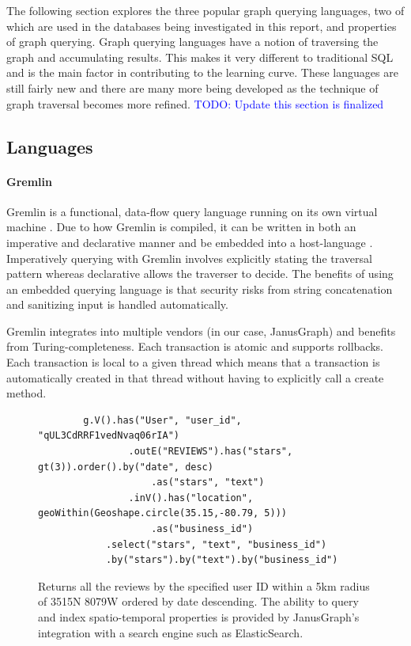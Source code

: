 The following section explores the three popular graph querying languages, two of which are used in the databases being investigated in this report, and properties of graph querying. Graph querying languages have a notion of traversing the graph and accumulating results. This makes it very different to traditional SQL and is the main factor in contributing to the learning curve. These languages are still fairly new and there are many more being developed as the technique of graph traversal becomes more refined. \textcolor{blue}{TODO: Update this section is finalized}

\subsection{Languages}
\label{subsec:lang}

\paragraph{Gremlin}

Gremlin is a functional, data-flow query language running on its own virtual machine \cite{gremlin-tinkerpop}. Due to how Gremlin is compiled, it can be written in both an imperative and declarative manner and be embedded into a host-language \cite{tinkerpop-docs}. Imperatively querying with Gremlin involves explicitly stating the traversal pattern whereas declarative allows the traverser to decide. The benefits of using an embedded querying language is that security risks from string concatenation and sanitizing input is handled automatically.

Gremlin integrates into multiple vendors (in our case, JanusGraph) and benefits from Turing-completeness. Each transaction is atomic and supports rollbacks. Each transaction is local to a given thread which means that a transaction is automatically created in that thread without having to explicitly call a create method.

\begin{figure}
    \centering
    \begin{verbatim}
        g.V().has("User", "user_id", "qUL3CdRRF1vedNvaq06rIA")
                .outE("REVIEWS").has("stars", gt(3)).order().by("date", desc)
                    .as("stars", "text")
                .inV().has("location", geoWithin(Geoshape.circle(35.15,-80.79, 5)))
                    .as("business_id")
            .select("stars", "text", "business_id")
            .by("stars").by("text").by("business_id")
    \end{verbatim}
    \caption{Returns all the reviews by the specified user ID within a 5km radius of 35\degree 15N 80\degree 79W ordered by date descending. The ability to query and index spatio-temporal properties is provided by JanusGraph's integration with a search engine such as ElasticSearch.}
    \label{lst:gremlin-example-1}
\end{figure}

